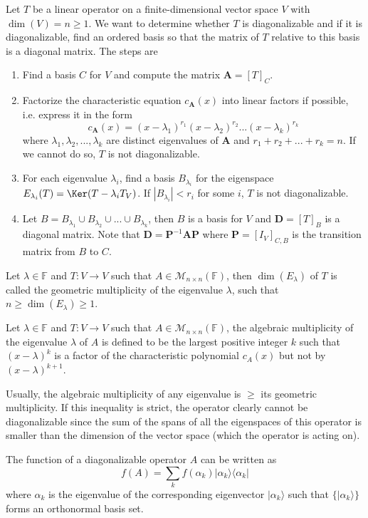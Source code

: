 \documentclass[a4paper]{article}
\begin{document}
\begin{Note}\label{algorithmdiagonalizable}
Let $T$ be a linear operator on a finite-dimensional vector space $V$ with $\dim(V)=n\geq1$. We want to determine whether $T$ is diagonalizable and if it is diagonalizable, find an ordered basis so that the matrix of $T$ relative to this basis is a diagonal matrix. The steps are
\begin{enumerate}
    \item Find a basis $C$ for $V$ and compute the matrix $\mathbf{A}=[T]_C$.
    \item Factorize the characteristic equation $c_{\mathbf{A}}(x)$ into linear factors if possible, i.e. express it in the form
    $$c_{\mathbf{A}}(x)=(x-\lambda_1)^{r_1}(x-\lambda_2)^{r_2}...(x-\lambda_k)^{r_k}$$
    where $\lambda_1,\lambda_2,...,\lambda_k$ are distinct eigenvalues of $\mathbf{A}$ and $r_1+r_2+...+r_k=n$. If we cannot do so, $T$ is not diagonalizable.
    \item For each eigenvalue $\lambda_i$, find a basis $B_{\lambda_i}$ for the eigenspace $E_{\lambda_i}(T)=\Ker(T-\lambda_iT_V)$. If $|B_{\lambda_i}|<r_i$ for some $i$, $T$ is not diagonalizable.
    \item Let $B=B_{\lambda_1}\cup B_{\lambda_2}\cup...\cup B_{\lambda_k}$, then $B$ is a basis for $V$ and $\mathbf{D}=[T]_B$ is a diagonal matrix. Note that $\mathbf{D}=\mathbf{P}^{-1}\mathbf{A}\mathbf{P}$ where $\mathbf{P}=[I_V]_{C,B}$ is the transition matrix from $B$ to $C$.
\end{enumerate}
\end{Note}
\begin{defi}
Let $\lambda\in\mathbb{F}$ and $T:V\rightarrow V$ such that $A\in\mathcal{M}_{n\times n}(\mathbb{F})$, then $\dim(E_{\lambda})$ of $T$ is called the geometric multiplicity of the eigenvalue $\lambda$, such that $n\geq\dim(E_{\lambda})\geq1$.
\end{defi}
\begin{defi}
Let $\lambda\in\mathbb{F}$ and $T:V\rightarrow V$ such that $A\in\mathcal{M}_{n\times n}(\mathbb{F})$, the algebraic multiplicity of the eigenvalue $\lambda$ of $A$ is defined to be the largest positive integer $k$ such that $(x-\lambda)^k$ is a factor of the characteristic polynomial $c_A(x)$ but not by $(x-\lambda)^{k+1}$.
\end{defi}
Usually, the algebraic multiplicity of any eigenvalue is $\geq$ its geometric multiplicity. If this inequality is strict, the operator clearly cannot be diagonalizable since the sum of the spans of all the eigenspaces of this operator is smaller than the dimension of the vector space (which the operator is acting on).
\begin{thm}
The function of a diagonalizable operator $A$ can be written as
$$f(A)=\sum_kf(\alpha_k)|\alpha_k\rangle\langle\alpha_k|$$
where $\alpha_k$ is the eigenvalue of the corresponding eigenvector $|\alpha_k\rangle$ such that $\{|\alpha_k\rangle\}$ forms an orthonormal basis set.
\end{thm}
\newpage
\end{document}
